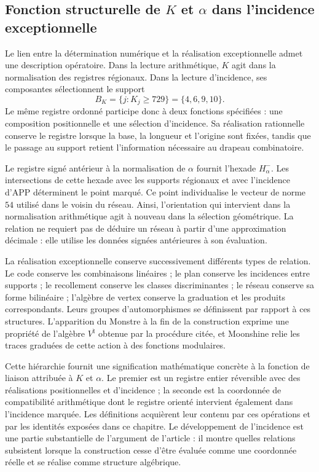 \subsection{Fonction structurelle de \texorpdfstring{\(K\) et \(\alpha\)}{K et alpha} dans l'incidence exceptionnelle}

Le lien entre la détermination numérique et la réalisation exceptionnelle
admet une description opératoire. Dans la lecture arithmétique, \(K\)
agit dans la normalisation des registres régionaux. Dans la lecture
d'incidence, ses composantes sélectionnent le support
\[
 B_K=\{j:K_j\geq729\}=\{4,6,9,10\}.
\]
Le même registre ordonné participe donc à deux fonctions
spécifiées : une composition positionnelle et une sélection d'incidence.
Sa réalisation rationnelle conserve le registre lorsque la base,
la longueur et l'origine sont fixées, tandis que le passage au support retient
l'information nécessaire au drapeau combinatoire.

Le registre signé antérieur à la normalisation de \(\alpha\) fournit
l'hexade \(H_\alpha^-\). Les intersections de cette hexade avec les
supports régionaux et avec l'incidence d'APP déterminent le point
marqué. Ce point individualise le vecteur de norme \(54\) utilisé
dans le voisin du réseau. Ainsi, l'orientation qui intervient dans la
normalisation arithmétique agit à nouveau dans la sélection géométrique.
La relation ne requiert pas de déduire un réseau à partir d'une approximation
décimale : elle utilise les données signées antérieures à son évaluation.

La réalisation exceptionnelle conserve successivement différents types de
relation. Le code conserve les combinaisons linéaires ; le plan conserve
les incidences entre supports ; le recollement conserve les classes discriminantes ;
le réseau conserve sa forme bilinéaire ; l'algèbre de vertex conserve la
graduation et les produits correspondants. Leurs groupes d'automorphismes
se définissent par rapport à ces structures. L'apparition du Monstre à
la fin de la construction exprime une propriété de l'algèbre
\(V^\natural\) obtenue par la procédure citée, et Moonshine
relie les traces graduées de cette action à des fonctions modulaires.

Cette hiérarchie fournit une signification mathématique concrète à la
fonction de liaison attribuée à \(K\) et \(\alpha\). Le premier est un
registre entier réversible avec des réalisations positionnelles et
d'incidence ; la seconde est la coordonnée de compatibilité arithmétique
dont le registre orienté intervient également dans l'incidence marquée.
Les définitions acquièrent leur contenu par ces opérations et par les
identités exposées dans ce chapitre. Le développement de l'incidence
est une partie substantielle de l'argument de l'article : il montre quelles relations
subsistent lorsque la construction cesse d'être évaluée comme une coordonnée
réelle et se réalise comme structure algébrique.
